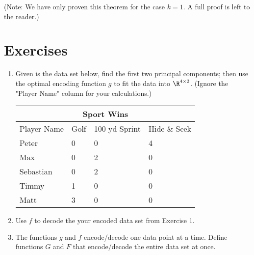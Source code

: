 (Note: We have only proven this theorem for the case $k = 1$.  A full proof is left to the reader.)

\section{Exercises}
\begin{enumerate}
    \item Given is the data set below, find the first two principal components; then use the optimal encoding function $g$ to fit the data into $\R^{4 \times 2}$.  (Ignore the "Player Name" column for your calculations.)

\begin{table}[H]
\centering
\begin{tabular}{ |p{2cm}||p{2cm}|p{2cm}||p{2cm}|  }
    \hline
    \multicolumn{4}{|c|}{Sport Wins} \\
    \hline
    Player Name & Golf & 100 yd Sprint & Hide $\&$ Seek\\
    \hline
    Peter       & 0 & 0 & 4\\
    Max         & 0 & 2 & 0\\
    Sebastian   & 0 & 2 & 0\\
    Timmy       & 1 & 0 & 0\\
    Matt        & 3 & 0 & 0\\
    \hline
\end{tabular}
\end{table}
    \item Use $f$ to decode the your encoded data set from Exercise 1.
    \item The functions $g$ and $f$ encode/decode one data point at a time.  Define functions $G$ and $F$ that encode/decode the entire data set at once.
\end{enumerate}

